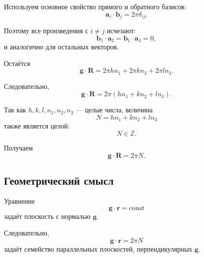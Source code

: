 \documentclass[../final.tex]{subfiles}
\begin{document}
Используем основное свойство прямого и обратного базисов:
%
\begin{equation*}
    \mathbf a_i\cdot\mathbf b_j
    =
    2\pi\delta_{ij}.
\end{equation*}

Поэтому все произведения с $i\neq j$ исчезают:
%
\begin{equation*}
    \mathbf b_1\cdot\mathbf a_2
    =
    \mathbf b_1\cdot\mathbf a_3
    =
    0,
\end{equation*}
%
и аналогично для остальных векторов.

Остаётся
%
\begin{equation*}
    \mathbf g\cdot\mathbf R
    =
    2\pi hn_1
    +
    2\pi kn_2
    +
    2\pi ln_3.
\end{equation*}

Следовательно,
%
\begin{equation*}
    \boxed{
        \mathbf g\cdot\mathbf R
        =
        2\pi
        \left(
            hn_1+kn_2+ln_3
        \right)
    }.
\end{equation*}

Так как $h,k,l,n_1,n_2,n_3$ --- целые числа, величина
%
\begin{equation*}
    N
    =
    hn_1+kn_2+ln_3
\end{equation*}
%
также является целой:
%
\begin{equation*}
    N\in\mathbb Z.
\end{equation*}

Получаем
%
\begin{equation*}
    \boxed{
        \mathbf g\cdot\mathbf R
        =
        2\pi N
    }.
\end{equation*}



\subsection*{Геометрический смысл}

Уравнение
%
\begin{equation*}
    \mathbf g\cdot\mathbf r
    =
    \mathrm{const}
\end{equation*}
%
задаёт плоскость с нормалью $\mathbf g$.

Следовательно,
%
\begin{equation*}
    \boxed{
        \mathbf g\cdot\mathbf r
        =
        2\pi N
    }
\end{equation*}
%
задаёт семейство параллельных плоскостей,
перпендикулярных $\mathbf g$.
\end{document}
